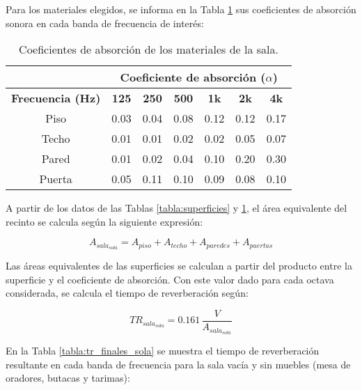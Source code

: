 		Para los materiales elegidos, se informa en la Tabla \ref{tabla:coeficientes_sola} sus coeficientes de absorción sonora en cada banda de frecuencia de interés:
		
			\begin{table}[H]
			\centering
			\begin{tabular}{@{}ccccccc@{}}
				 & \multicolumn{6}{c}{\textbf{Coeficiente de absorción ($\alpha$)}}\\ \toprule
				\textbf{Frecuencia (Hz)} & \textbf{125} & \textbf{250} & \textbf{500} & \textbf{1k} & \textbf{2k} & \textbf{4k}   \\ \midrule
					Piso                & 0.03 & 0.04 & 0.08 & 0.12 & 0.12 & 0.17 \\ \midrule
					Techo               & 0.01 & 0.01 & 0.02 & 0.02 & 0.05 & 0.07 \\ \midrule
					Pared               & 0.01 & 0.02 & 0.04 & 0.10 & 0.20 & 0.30 \\ \midrule
					Puerta              & 0.05 & 0.11 & 0.10 & 0.09 & 0.08 & 0.10 \\ \bottomrule
			\end{tabular}%
			\caption{Coeficientes de absorción de los materiales de la sala.}
			\label{tabla:coeficientes_sola}
		\end{table}
		
		A partir de los datos de las Tablas \ref{tabla:superficies} y \ref{tabla:coeficientes_sola}, el área equivalente del recinto se calcula según la siguiente expresión:
		
		\begin{equation}
			A_{sala_{sola}} = A_{piso} + A_{techo} + A_{paredes} + A_{puertas}
		\end{equation}
		
		Las áreas equivalentes de las superficies se calculan a partir del producto entre la superficie y el coeficiente de absorción. Con este valor dado para cada octava considerada, se calcula el tiempo de reverberación según:

		\begin{equation}
			TR_{sala_{sola}} = 0.161 \, \frac{V}{A_{sala_{sola}}}
		\end{equation}
		
		En la Tabla \ref{tabla:tr_finales_sola} se muestra el tiempo de reverberación resultante en cada banda de frecuencia para la sala vacía y sin muebles (mesa de oradores, butacas y tarimas):
		
